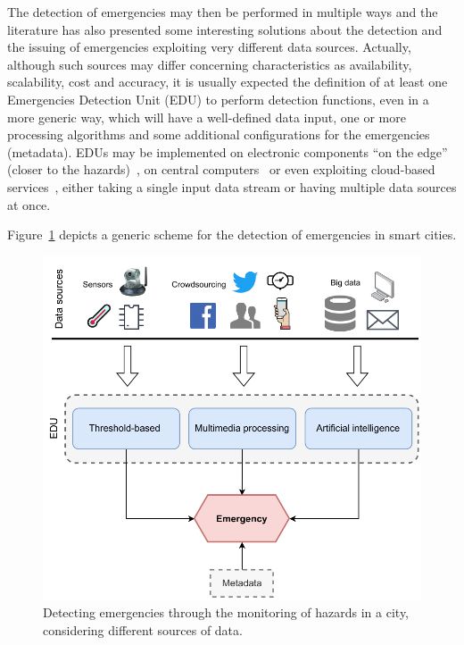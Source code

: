 \begin{refsection}
The detection of emergencies may then be performed in multiple ways and the literature has also presented some interesting solutions about the detection and the issuing of emergencies exploiting very different data sources. Actually, although such sources may differ concerning characteristics as availability, scalability, cost and accuracy, it is usually expected the definition of at least one Emergencies Detection Unit (EDU) to perform detection functions, even in a more generic way, which will have a well-defined data input, one or more processing algorithms and some additional configurations for the emergencies (metadata). EDUs may be implemented on electronic components ``on the edge'' (closer to the hazards)~\cite{PlatformsSC,sensorsplatforms}, on central computers~\cite{twitterDetection2,centralserver1} or even exploiting cloud-based services~\cite{cloud1}, either taking a single input data stream or having multiple data sources at once. 

Figure~\ref{Fig:detection} depicts a generic scheme for the detection of emergencies in smart cities. 

\begin{figure}[ht]
  \centering
  \includegraphics[scale=0.6]{Chapters/1-Survey/images/detection.pdf}
  \caption{Detecting emergencies through the monitoring of hazards in a city, considering different sources of data.}\label{Fig:detection}
\end{figure}


\end{refsection}
